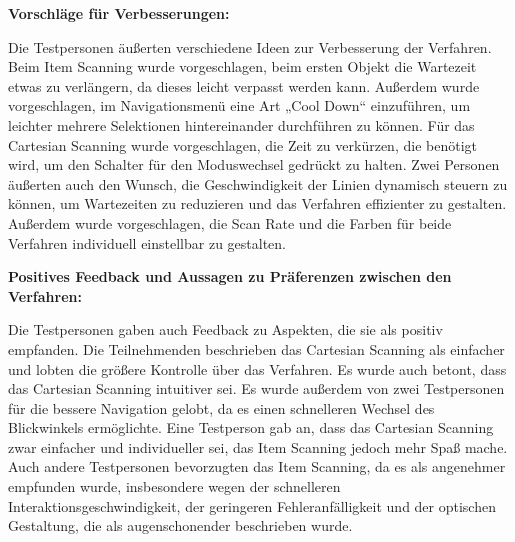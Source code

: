 \textbf{Vorschläge für Verbesserungen:}

Die Testpersonen äußerten verschiedene Ideen zur Verbesserung der Verfahren. Beim Item Scanning wurde vorgeschlagen, beim ersten Objekt die Wartezeit etwas zu verlängern, da dieses leicht verpasst werden kann. Außerdem wurde vorgeschlagen, im Navigationsmenü eine Art „Cool Down“ einzuführen, um leichter mehrere Selektionen hintereinander durchführen zu können. Für das Cartesian Scanning wurde vorgeschlagen, die Zeit zu verkürzen, die benötigt wird, um den Schalter für den Moduswechsel gedrückt zu halten. Zwei Personen äußerten auch den Wunsch, die Geschwindigkeit der Linien dynamisch steuern zu können, um Wartezeiten zu reduzieren und das Verfahren effizienter zu gestalten. Außerdem wurde vorgeschlagen, die Scan Rate und die Farben für beide Verfahren individuell einstellbar zu gestalten.

\textbf{Positives Feedback und Aussagen zu Präferenzen zwischen den Verfahren:}

Die Testpersonen gaben auch Feedback zu Aspekten, die sie als positiv empfanden. Die Teilnehmenden beschrieben das Cartesian Scanning als einfacher und lobten die größere Kontrolle über das Verfahren. Es wurde auch betont, dass das Cartesian Scanning intuitiver sei. Es wurde außerdem von zwei Testpersonen für die bessere Navigation gelobt, da es einen schnelleren Wechsel des Blickwinkels ermöglichte. Eine Testperson gab an, dass das Cartesian Scanning zwar einfacher und individueller sei, das Item Scanning jedoch mehr Spaß mache. Auch andere Testpersonen bevorzugten das Item Scanning, da es als angenehmer empfunden wurde, insbesondere wegen der schnelleren Interaktionsgeschwindigkeit, der geringeren Fehleranfälligkeit und der optischen Gestaltung, die als augenschonender beschrieben wurde. 


